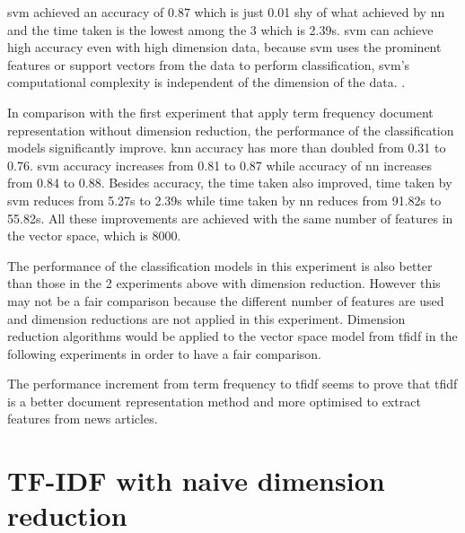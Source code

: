 \Ac{svm} achieved an accuracy of 0.87 which is just 0.01 shy of what achieved by \ac{nn} and the time taken is the lowest among the 3 which is 2.39s. \Ac{svm} can achieve high accuracy even with high dimension data, because \ac{svm} uses the prominent features or support vectors from the data to perform classification, \ac{svm}'s computational complexity is independent of the dimension of the data. \cite{dimRedCat}.

In comparison with the first experiment that apply term frequency document representation without dimension reduction, the performance of the classification models significantly improve. \Ac{knn} accuracy has more than doubled from 0.31 to 0.76. \Ac{svm} accuracy increases from 0.81 to 0.87 while accuracy of \ac{nn} increases from  0.84 to 0.88. Besides accuracy, the time taken also improved, time taken by \ac{svm} reduces from 5.27s to 2.39s while time taken by \ac{nn} reduces from 91.82s to 55.82s. All these improvements are achieved with the same number of features in the vector space, which is 8000. 

The performance of the classification models in this experiment is also better than those in the 2 experiments above with dimension reduction. However this may not be a fair comparison because the different number of features are used and dimension reductions are not applied in this experiment. Dimension reduction algorithms would be applied to the vector space model from \ac{tfidf} in the following experiments in order to have a fair comparison.

The performance increment from term frequency to \ac{tfidf} seems to prove that \ac{tfidf} is a better document representation method and more optimised to extract features from news articles.\\

\section{TF-IDF with naive dimension reduction}

